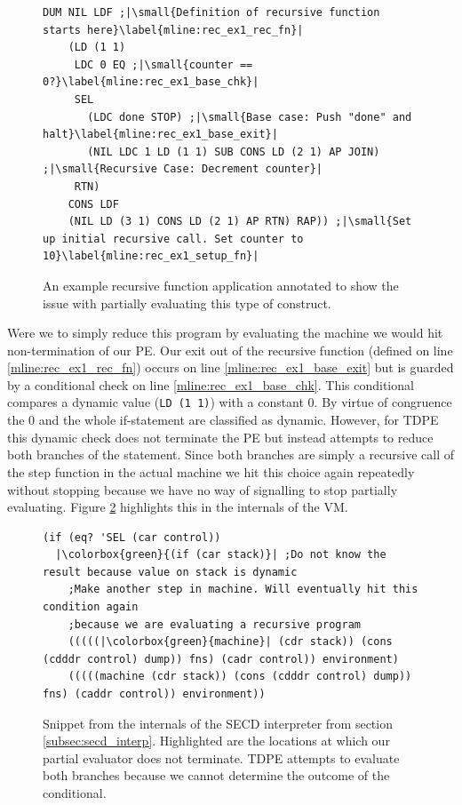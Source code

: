 \documentclass[a4paper,12pt,twoside,openright]{report}
\theoremstyle{definition}
\begin{document}
\begin{figure}[ht]
\begin{verbatim}
DUM NIL LDF ;|\small{Definition of recursive function starts here}\label{mline:rec_ex1_rec_fn}|
    (LD (1 1)
     LDC 0 EQ ;|\small{counter == 0?}\label{mline:rec_ex1_base_chk}|
     SEL
       (LDC done STOP) ;|\small{Base case: Push "done" and halt}\label{mline:rec_ex1_base_exit}|
       (NIL LDC 1 LD (1 1) SUB CONS LD (2 1) AP JOIN) ;|\small{Recursive Case: Decrement counter}|
     RTN)
    CONS LDF
    (NIL LD (3 1) CONS LD (2 1) AP RTN) RAP)) ;|\small{Set up initial recursive call. Set counter to 10}\label{mline:rec_ex1_setup_fn}|
\end{verbatim}
\caption{An example recursive function application annotated to show the issue with partially evaluating this type of construct.}
\label{lst:secd_recursion_ex1}
\end{figure}

Were we to simply reduce this program by evaluating the machine we would hit non-termination of our PE. Our exit out of the recursive function (defined on line \ref{mline:rec_ex1_rec_fn}) occurs on line \ref{mline:rec_ex1_base_exit} but is guarded by a conditional check on line \ref{mline:rec_ex1_base_chk}. This conditional compares a dynamic value (\texttt{LD (1 1)}) with a constant 0. By virtue of congruence the 0 and the whole if-statement are classified as dynamic. However, for TDPE this dynamic check does not terminate the PE but instead attempts to reduce both branches of the statement. Since both branches are simply a recursive call of the step function in the actual machine we hit this choice again repeatedly without stopping because we have no way of signalling to stop partially evaluating. Figure \ref{lst:secd_recursion_machine_ex1} highlights this in the internals of the VM.

\begin{figure}[ht!]
\begin{verbatim}
(if (eq? 'SEL (car control))
  |\colorbox{green}{(if (car stack)}| ;Do not know the result because value on stack is dynamic
    ;Make another step in machine. Will eventually hit this condition again
    ;because we are evaluating a recursive program
    (((((|\colorbox{green}{machine}| (cdr stack)) (cons (cdddr control) dump)) fns) (cadr control)) environment)
    (((((machine (cdr stack)) (cons (cdddr control) dump)) fns) (caddr control)) environment))
\end{verbatim}
\caption{Snippet from the internals of the SECD interpreter from section \ref{subsec:secd_interp}. Highlighted are the locations at which our partial evaluator does not terminate. TDPE attempts to evaluate both branches because we cannot determine the outcome of the conditional.}
\label{lst:secd_recursion_machine_ex1}
\end{figure}
\end{document}
